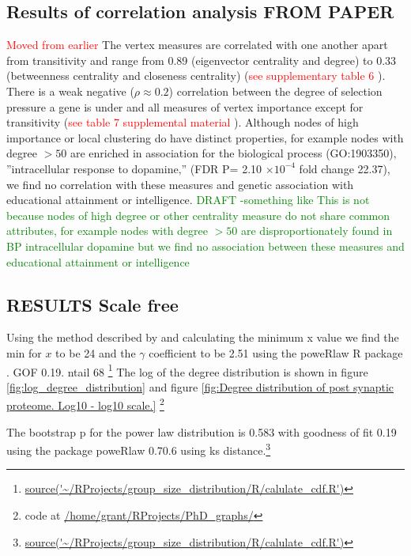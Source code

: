 \subsection{Results of correlation analysis FROM PAPER}
\textcolor{red}{Moved from earlier}
The vertex measures are correlated with one another apart from transitivity and range from 0.89 (eigenvector centrality and degree) to 0.33 (betweenness centrality and closeness centrality) (\textcolor{red}{see supplementary table 6} ).
There is a weak negative ($\rho \approx 0.2$) correlation between 
the degree of selection pressure a gene is under and all measures of vertex importance except for transitivity (\textcolor{red}{see table 7 supplemental material} ).
Although nodes of high importance or local clustering do have distinct properties, for example nodes with degree $> 50$ are enriched in association for the biological process (GO:1903350)‚ ”intracellular response to dopamine‚” (FDR P= 2.10 $\times 10^{-4}$ fold change 22.37), we find no correlation with these measures and genetic association with educational attainment or intelligence. 
\textcolor{green}{DRAFT -something like This is not because nodes of high degree or other centrality measure do not share common attributes, for example nodes with degree $>50$ are disproportionately found in BP intracellular dopamine but we find no association between these measures and educational attainment or intelligence}



\subsection{RESULTS Scale free}
Using the method described by \cite{clauset2009power} and calculating the minimum x value we find the min for $x$ to be 24 and the $\gamma$ coefficient to be 2.51 using the poweRlaw R package \cite{gillespie2015fitting}. GOF 0.19. ntail 68 \footnote{\url{source('~/RProjects/group_size_distribution/R/calulate_cdf.R')}} The log of the degree distribution is shown in figure \ref{fig:log_degree_distribution} and figure \ref{fig:Degree distribution of post synaptic proteome. Log10 - log10 scale.}
\footnote{code at \url{/home/grant/RProjects/PhD_graphs/}}


The bootstrap p for the power law distribution is 0.583 with goodness of fit 0.19 using the package poweRlaw 0.70.6 using ks distance.\footnote{\url{source('~/RProjects/group_size_distribution/R/calulate_cdf.R')}}

